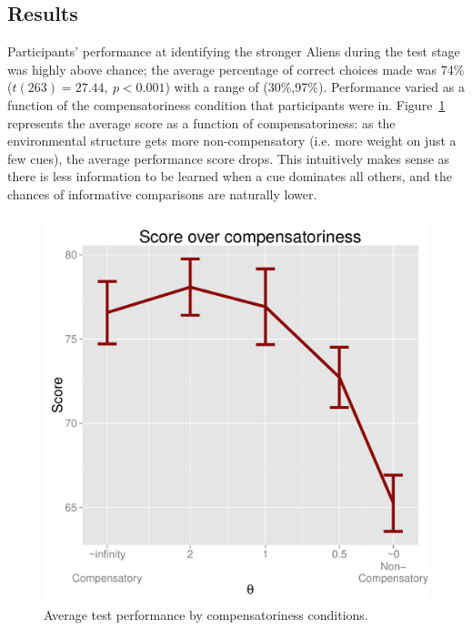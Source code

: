 \documentclass[10pt,letterpaper]{article}
\begin{document}
\subsection{Results}
Participants' performance at identifying the stronger Aliens during the test stage was highly above chance; the average percentage of correct choices made was 74\% ($t(263) = 27.44,~p< 0.001$) with a range of (30\%,97\%). Performance varied as a function of the compensatoriness condition that participants were in. Figure~\ref{performance} represents the average score as a function of compensatoriness: as the environmental structure gets more non-compensatory (i.e. more weight on just a few cues), the average performance score drops. This intuitively makes sense as there is less information to be learned when a cue dominates all others, and the chances of informative comparisons are naturally lower. 
\begin{figure}[htb!]
	\centering
\caption{Average test performance by compensatoriness conditions.}
	\label{performance}
	\centering
	\includegraphics[scale=0.4]{score.pdf}
	
\end{figure}
\end{document}

